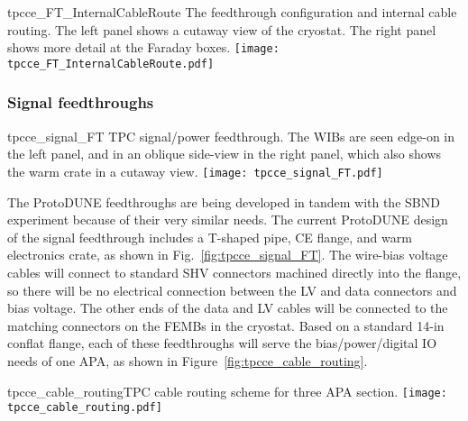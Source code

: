 \begin{cdrfigure}{tpcce_FT_InternalCableRoute}{
The feedthrough configuration and internal cable routing. The left panel shows a cutaway view of the cryostat.
The right panel shows more detail at the Faraday boxes.}
\texttt{[image: tpcce\_FT\_InternalCableRoute.pdf]}
\end{cdrfigure}

%
\subsubsection{Signal feedthroughs}
\label{subsubsec:ce_feedthroughs}

\begin{cdrfigure}{tpcce_signal_FT}{
TPC signal/power feedthrough. The WIBs are seen edge-on in the left panel,
and in an oblique side-view in the right panel, which also shows the warm crate in a cutaway view.}
\texttt{[image: tpcce\_signal\_FT.pdf]}
\end{cdrfigure}

The ProtoDUNE feedthroughs are being developed in tandem with the SBND experiment because of their very similar needs.
The current ProtoDUNE design of the signal feedthrough includes a T-shaped pipe, CE flange, and warm electronics crate, as shown in Fig.~\ref{fig:tpcce_signal_FT}.
The wire-bias voltage cables will connect to standard SHV connectors machined directly into the flange,
so there will be no electrical connection between the LV and data connectors and bias voltage.
The other ends of the data and LV cables will be connected to the matching connectors on the FEMBs in the cryostat.
Based on a standard 14-in conflat flange,
each of these feedthroughs will serve the bias/power/digital IO needs of one APA, as shown 
in Figure~\ref{fig:tpcce_cable_routing}.  

\begin{cdrfigure}{tpcce_cable_routing}{TPC cable routing scheme for three APA section.}
\texttt{[image: tpcce\_cable\_routing.pdf]}
\end{cdrfigure}


